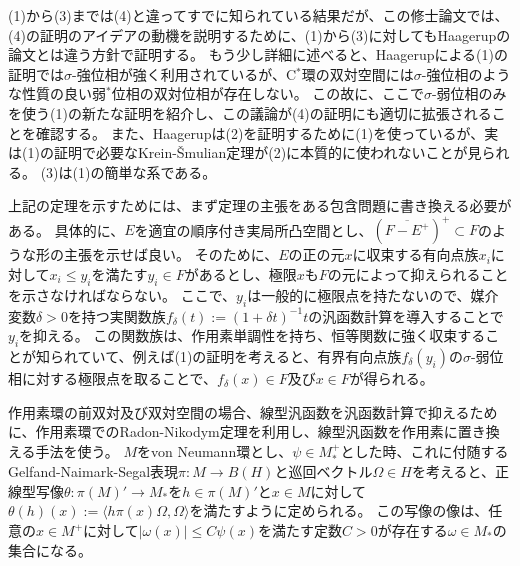 \documentclass[noamsfonts,a4paper,10pt]{amsart}
\theoremstyle{plain}
\theoremstyle{definition}
\theoremstyle{remark}
\begin{document}
(1)から(3)までは(4)と違ってすでに知られている結果だが、この修士論文では、(4)の証明のアイデアの動機を説明するために、(1)から(3)に対してもHaagerupの論文とは違う方針で証明する。
もう少し詳細に述べると、Haagerupによる(1)の証明では$\sigma$-強位相が強く利用されているが、C$^*$環の双対空間には$\sigma$-強位相のような性質の良い弱$^*$位相の双対位相が存在しない。
この故に、ここで$\sigma$-弱位相のみを使う(1)の新たな証明を紹介し、この議論が(4)の証明にも適切に拡張されることを確認する。
また、Haagerupは(2)を証明するために(1)を使っているが、実は(1)の証明で必要なKrein-\v Smulian定理が(2)に本質的に使われないことが見られる。
(3)は(1)の簡単な系である。

上記の定理を示すためには、まず定理の主張をある包含問題に書き換える必要がある。
具体的に、$E$を適宜の順序付き実局所凸空間とし、$(\overline{F-E^+})^+\subset F$のような形の主張を示せば良い。
そのために、$E$の正の元$x$に収束する有向点族$x_i$に対して$x_i\le y_i$を満たす$y_i\in F$があるとし、極限$x$も$F$の元によって抑えられることを示さなければならない。
ここで、$y_i$は一般的に極限点を持たないので、媒介変数$\delta>0$を持つ実関数族$f_\delta(t):=(1+\delta t)^{-1}t$の汎函数計算を導入することで$y_i$を抑える。
この関数族は、作用素単調性を持ち、恒等関数に強く収束することが知られていて、例えば(1)の証明を考えると、有界有向点族$f_\delta(y_i)$の$\sigma$-弱位相に対する極限点を取ることで、$f_\delta(x)\in F$及び$x\in F$が得られる。

作用素環の前双対及び双対空間の場合、線型汎函数を汎函数計算で抑えるために、作用素環でのRadon-Nikodym定理を利用し、線型汎函数を作用素に置き換える手法を使う。
$M$をvon Neumann環とし、$\psi\in M_*^+$とした時、これに付随するGelfand-Naimark-Segal表現$\pi:M\to B(H)$と巡回ベクトル$\Omega\in H$を考えると、正線型写像$\theta:\pi(M)'\to M_*$を$h\in\pi(M)'$と$x\in M$に対して$\theta(h)(x):=\langle h\pi(x)\Omega,\Omega\rangle$を満たすように定められる。
この写像の像は、任意の$x\in M^+$に対して$|\omega(x)|\le C\psi(x)$を満たす定数$C>0$が存在する$\omega\in M_*$の集合になる。
\end{document}
